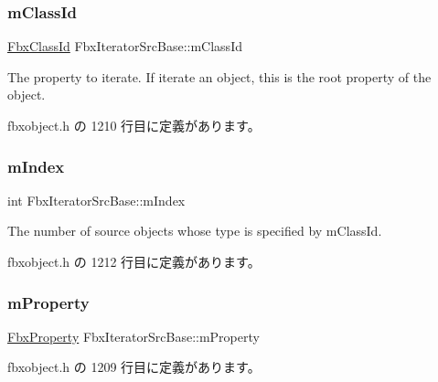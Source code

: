 \subsubsection{\texorpdfstring{m\+Class\+Id}{mClassId}}
{\footnotesize\ttfamily \hyperlink{class_fbx_class_id}{Fbx\+Class\+Id} Fbx\+Iterator\+Src\+Base\+::m\+Class\+Id\hspace{0.3cm}{\ttfamily [protected]}}



The property to iterate. If iterate an object, this is the root property of the object. 



 fbxobject.\+h の 1210 行目に定義があります。

\mbox{\label{class_fbx_iterator_src_base_adfb8404f7244dfdbe9e40cfc4d9e53b6}} 
\subsubsection{\texorpdfstring{m\+Index}{mIndex}}
{\footnotesize\ttfamily int Fbx\+Iterator\+Src\+Base\+::m\+Index\hspace{0.3cm}{\ttfamily [protected]}}



The number of source objects whose type is specified by m\+Class\+Id. 



 fbxobject.\+h の 1212 行目に定義があります。

\mbox{\label{class_fbx_iterator_src_base_aa07b855d779bd7b3383ef7a41dbab232}} 
\subsubsection{\texorpdfstring{m\+Property}{mProperty}}
{\footnotesize\ttfamily \hyperlink{class_fbx_property}{Fbx\+Property} Fbx\+Iterator\+Src\+Base\+::m\+Property\hspace{0.3cm}{\ttfamily [protected]}}



 fbxobject.\+h の 1209 行目に定義があります。


